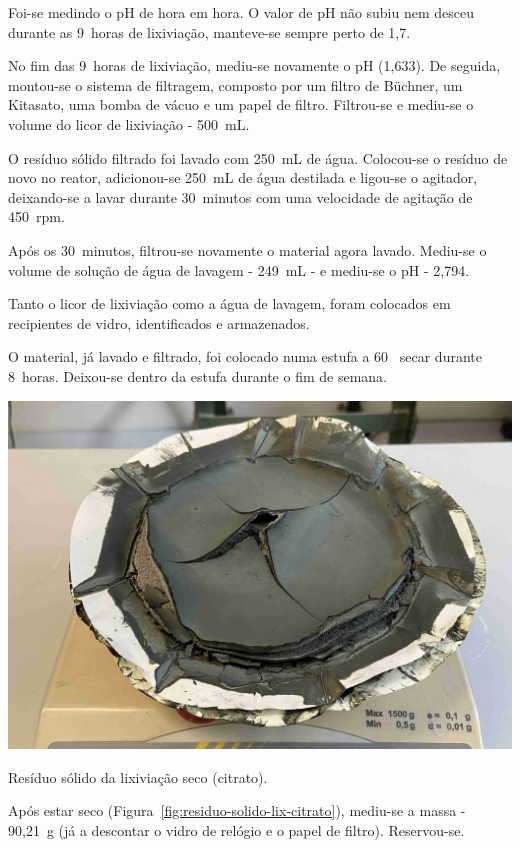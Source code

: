 Foi-se medindo o pH de hora em hora.
O valor de pH não subiu nem desceu durante as 9~horas de lixiviação, manteve-se sempre perto de 1,7.

No fim das 9~horas de lixiviação, mediu-se novamente o pH (1,633).
De seguida, montou-se o sistema de filtragem, composto por um filtro de Büchner, um Kitasato, uma bomba de vácuo e um papel de filtro.
Filtrou-se e mediu-se o volume do licor de lixiviação - 500~mL.

O resíduo sólido filtrado foi lavado com 250~mL de água.
Colocou-se o resíduo de novo no reator, adicionou-se 250~mL de água destilada e ligou-se o agitador, deixando-se a lavar durante 30~minutos com uma velocidade de agitação de 450~rpm.

Após os 30~minutos, filtrou-se novamente o material agora lavado.
Mediu-se o volume de solução de água de lavagem - 249~mL - e mediu-se o pH - 2,794.

Tanto o licor de lixiviação como a água de lavagem, foram colocados em recipientes de vidro, identificados e armazenados.

O material, já lavado e filtrado, foi colocado numa estufa a 60~\graus{} secar durante 8~horas. 
Deixou-se dentro da estufa durante o fim de semana.

\begin{marginfigure}
    \centering
    \includegraphics[width=0.9\linewidth]{figures/Resíduo Sólido Lixiviação Citrato.jpg}
    \caption{Resíduo sólido da lixiviação seco (citrato).}
    \label{fig:residuo-solido-lix-citrato}
\end{marginfigure}

Após estar seco (Figura~\ref{fig:residuo-solido-lix-citrato}), mediu-se a massa - 90,21~g (já a descontar o vidro de relógio e o papel de filtro). 
Reservou-se.


